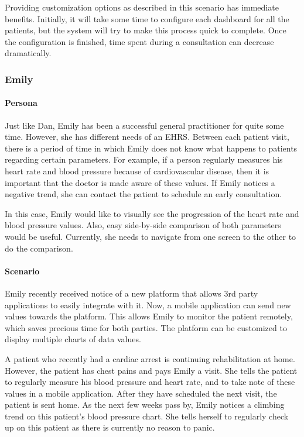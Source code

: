         \noindent Providing customization options as described in this scenario has immediate benefits. Initially, it will take some time to configure each dashboard for all the patients, but the system will try to make this process quick to complete. Once the configuration is finished, time spent during a consultation can decrease dramatically.
        
        \subsubsection{Emily}

        \paragraph{Persona} Just like Dan, Emily has been a successful general practitioner for quite some time. However, she has different needs of an EHRS\@. Between each patient visit, there is a period of time in which Emily does not know what happens to patients regarding certain parameters. For example, if a person regularly measures his heart rate and blood pressure because of cardiovascular disease, then it is important that the doctor is made aware of these values. If Emily notices a negative trend, she can contact the patient to schedule an early consultation.
        
        In this case, Emily would like to visually see the progression of the heart rate and blood pressure values. Also, easy side-by-side comparison of both parameters would be useful. Currently, she needs to navigate from one screen to the other to do the comparison.
        
        \paragraph{Scenario} Emily recently received notice of a new platform that allows 3rd party applications to easily integrate with it. Now, a mobile application can send new values towards the platform. This allows Emily to monitor the patient remotely, which saves precious time for both parties. The platform can be customized to display multiple charts of data values.

        A patient who recently had a cardiac arrest is continuing rehabilitation at home. However, the patient has chest pains and pays Emily a visit. She tells the patient to regularly measure his blood pressure and heart rate, and to take note of these values in a mobile application. After they have scheduled the next visit, the patient is sent home. As the next few weeks pass by, Emily notices a climbing trend on this patient's blood pressure chart. She tells herself to regularly check up on this patient as there is currently no reason to panic.
        
